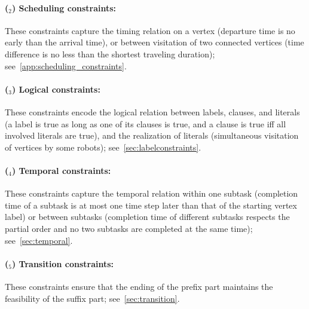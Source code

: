 \documentclass[Afour,sageh,times]{sagej}
\newcounter{mycounter}
\begin{document}
\paragraph{($_2$) Scheduling constraints:} These constraints capture the timing relation on a vertex (departure time is no early than the arrival time), or between visitation of two connected vertices (time difference is no less than the shortest traveling duration); see~\ref{app:scheduling_constraints}.
\paragraph{($_3$) Logical constraints:} These constraints encode the logical relation between labels, clauses, and literals (a label is true as long as one of its clauses is true, and a clause is true iff all involved literals are true), and the realization of literals (simultaneous visitation of vertices by some robots); see~\ref{sec:labelconstraints}.
\paragraph{($_4$) Temporal constraints:} These constraints capture the temporal relation within one subtask (completion time of a subtask is at most one time step later than that of the starting vertex label) or between subtasks (completion time of different subtasks respects the partial order and no two subtasks are completed at the same time); see~\ref{sec:temporal}.
\paragraph{($_5$) Transition constraints:} These constraints ensure that the ending of the prefix part maintains the feasibility of the suffix part; see~\ref{sec:transition}.
\end{document}
